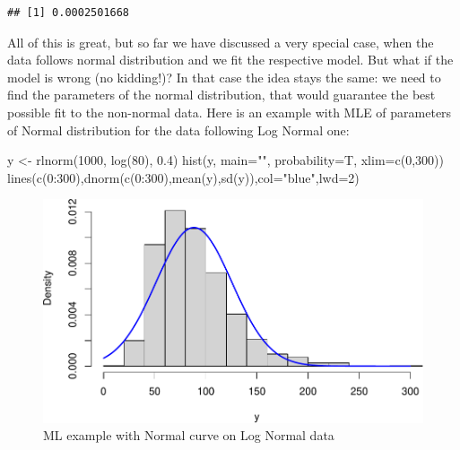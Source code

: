 \documentclass[
]{book}
\newenvironment{Shaded}{\begin{snugshade}}{\end{snugshade}}
\newcommand{\AttributeTok}[1]{\textcolor[rgb]{0.77,0.63,0.00}{#1}}
\newcommand{\DecValTok}[1]{\textcolor[rgb]{0.00,0.00,0.81}{#1}}
\newcommand{\FloatTok}[1]{\textcolor[rgb]{0.00,0.00,0.81}{#1}}
\newcommand{\FunctionTok}[1]{\textcolor[rgb]{0.00,0.00,0.00}{#1}}
\newcommand{\NormalTok}[1]{#1}
\newcommand{\OtherTok}[1]{\textcolor[rgb]{0.56,0.35,0.01}{#1}}
\newcommand{\SpecialCharTok}[1]{\textcolor[rgb]{0.00,0.00,0.00}{#1}}
\newcommand{\StringTok}[1]{\textcolor[rgb]{0.31,0.60,0.02}{#1}}
\theoremstyle{definition}
\theoremstyle{definition}
\theoremstyle{definition}
\theoremstyle{definition}
\theoremstyle{remark}
\begin{document}
\begin{verbatim}
## [1] 0.0002501668
\end{verbatim}

All of this is great, but so far we have discussed a very special case, when the data follows normal distribution and we fit the respective model. But what if the model is wrong (no kidding!)? In that case the idea stays the same: we need to find the parameters of the normal distribution, that would guarantee the best possible fit to the non-normal data. Here is an example with MLE of parameters of Normal distribution for the data following Log Normal one:

\begin{Shaded}
\begin{Highlighting}[]
\NormalTok{y }\OtherTok{\textless{}{-}} \FunctionTok{rlnorm}\NormalTok{(}\DecValTok{1000}\NormalTok{, }\FunctionTok{log}\NormalTok{(}\DecValTok{80}\NormalTok{), }\FloatTok{0.4}\NormalTok{)}
\FunctionTok{hist}\NormalTok{(y, }\AttributeTok{main=}\StringTok{""}\NormalTok{, }\AttributeTok{probability=}\NormalTok{T, }\AttributeTok{xlim=}\FunctionTok{c}\NormalTok{(}\DecValTok{0}\NormalTok{,}\DecValTok{300}\NormalTok{))}
\FunctionTok{lines}\NormalTok{(}\FunctionTok{c}\NormalTok{(}\DecValTok{0}\SpecialCharTok{:}\DecValTok{300}\NormalTok{),}\FunctionTok{dnorm}\NormalTok{(}\FunctionTok{c}\NormalTok{(}\DecValTok{0}\SpecialCharTok{:}\DecValTok{300}\NormalTok{),}\FunctionTok{mean}\NormalTok{(y),}\FunctionTok{sd}\NormalTok{(y)),}\AttributeTok{col=}\StringTok{"blue"}\NormalTok{,}\AttributeTok{lwd=}\DecValTok{2}\NormalTok{)}
\end{Highlighting}
\end{Shaded}

\begin{figure}
\centering
\includegraphics{Svetunkov---Statistics-for-Business-Analytics_files/figure-latex/MLENormalExample07-1.pdf}
\caption{\label{fig:MLENormalExample07}ML example with Normal curve on Log Normal data}
\end{figure}
\end{document}
